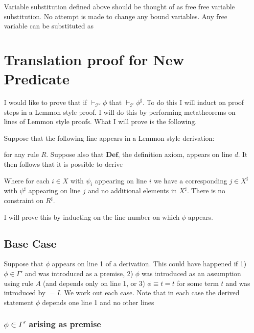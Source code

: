\documentclass[12pt]{article}
\newcommand{\bv}[1]{\boldsymbol{#1}}
\newcommand{\mc}[1]{\mathcal{#1}}
\newcommand{\bc}[1]{\bv{\mc{#1}}}
\begin{document}
Variable substitution defined above should be thought of as free free variable substitution. No attempt is made to change any bound variables. Any free variable can be substituted as


\section*{Translation proof for New Predicate}

I would like to prove that if $\vdash_{\bc{T}'}\phi$ that $\vdash_{\bc{T}}\phi^{\sharp}$. To do this I will induct on proof steps in a Lemmon style proof. I will do this by performing metatheorems on lines of Lemmon style proofs. What I will prove is the following.

Suppose that the following line appears in a Lemmon style derivation:

\begin{ND}[][][][][.6\linewidth]
\end{ND}

for any rule $R$.
Suppose also that $\textbf{Def}$, the definition axiom, appears on line $d$. It then follows that it is possible to derive

\begin{ND}[][][][][.6\linewidth]
\end{ND}

Where for each $i\in X$ with $\psi_i$ appearing on line $i$ we have a corresponding $j \in X^{\sharp}$ with $\psi^{\sharp}$ appearing on line $j$ and no additional elements in $X^{\sharp}$. There is no constraint on $R^{\sharp}$.

I will prove this by inducting on the line number on which $\phi$ appears.

\subsection*{Base Case}

Suppose that $\phi$ appears on line 1 of a derivation. This could have happened if 1) $\phi \in \Gamma'$ and was introduced as a premise, 2) $\phi$ was introduced as an assumption using rule $A$ (and depends only on line 1, or 3) $\phi \equiv t=t$ for some term $t$ and was introduced by $=I$. We work out each case. Note that in each case the derived statement $\phi$ depends one line 1 and no other lines

\subsubsection*{$\phi \in \Gamma'$ arising as premise}
\end{document}
